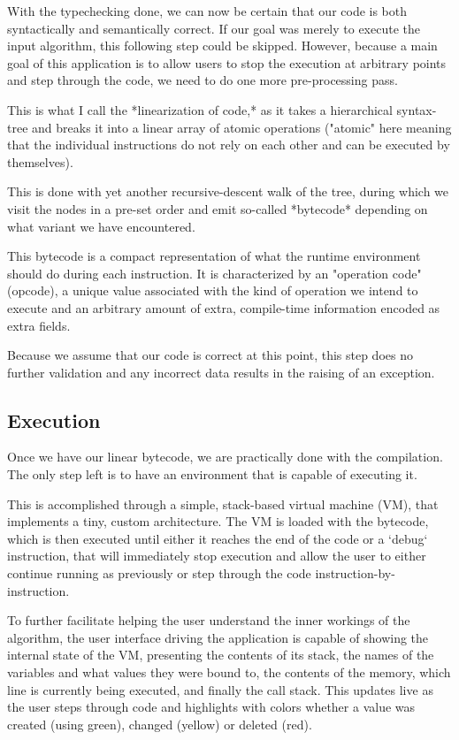 \documentclass[conference]{IEEEtran}
\begin{document}
With the typechecking done, we can now be certain that our code is both syntactically and semantically correct. If our goal was merely to execute the input algorithm, this following step could be skipped. However, because a main goal of this application is to allow users to stop the execution at arbitrary points and step through the code, we need to do one more pre-processing pass.

This is what I call the *linearization of code,* as it takes a hierarchical syntax-tree and breaks it into a linear array of atomic operations ("atomic" here meaning that the individual instructions do not rely on each other and can be executed by themselves).

This is done with yet another recursive-descent walk of the tree, during which we visit the nodes in a pre-set order and emit so-called *bytecode* depending on what variant we have encountered.

This bytecode is a compact representation of what the runtime environment should do during each instruction. It is characterized by an "operation code" (opcode), a unique value associated with the kind of operation we intend to execute and an arbitrary amount of extra, compile-time information encoded as extra fields.

Because we assume that our code is correct at this point, this step does no further validation and any incorrect data results in the raising of an exception.

\subsection{Execution}

Once we have our linear bytecode, we are practically done with the compilation. The only step left is to have an environment that is capable of executing it.

This is accomplished through a simple, stack-based virtual machine (VM), that implements a tiny, custom architecture. The VM is loaded with the bytecode, which is then executed until either it reaches the end of the code or a `debug` instruction, that will immediately stop execution and allow the user to either continue running as previously or step through the code instruction-by-instruction.

To further facilitate helping the user understand the inner workings of the algorithm, the user interface driving the application is capable of showing the internal state of the VM, presenting the contents of its stack, the names of the variables and what values they were bound to, the contents of the memory, which line is currently being executed, and finally the call stack. This updates live as the user steps through code and highlights with colors whether a value was created (using green), changed (yellow) or deleted (red).
\end{document}
